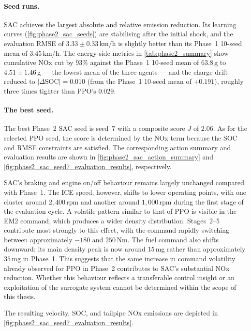 \paragraph{Seed runs.}
SAC achieves the largest absolute and relative emission reduction. Its learning curves (\autoref{fig:phase2_sac_seeds}) are stabilising after the initial shock, and the evaluation \ac{RMSE} of $3.33 \pm 0.33$\,km/h is slightly better than its Phase~1 10-seed mean of $3.45$\,km/h. The energy-side metrics in \autoref{tab:phase2_summary} show cumulative \ac{NOx} cut by $93\%$ against the Phase~1 10-seed mean of $63.8$\,g to $4.51 \pm 1.46$\,g --- the lowest mean of the three agents --- and the charge drift reduced to $|\Delta\text{SOC}| = 0.010$ (from the Phase~1 10-seed mean of $+0.191$), roughly three times tighter than PPO's $0.029$.

\paragraph{The best seed.}
The best Phase~2 SAC seed is seed~7 with a composite score $J$ of 2.06. As for the selected PPO seed, the score is determined by the \ac{NOx} term because the \ac{SOC} and \ac{RMSE} constraints are satisfied. The corresponding action summary and evaluation results are shown in \autoref{fig:phase2_sac_action_summary} and \autoref{fig:phase2_sac_seed7_evaluation_results}, respectively.

SAC's braking and engine on/off behaviour remains largely unchanged compared with Phase~1. The \ac{ICE} speed, however, shifts to lower operating points, with one cluster around $2{,}400$\,rpm and another around $1{,}000$\,rpm during the first stage of the evaluation cycle. A volatile pattern similar to that of PPO is visible in the \ac{EM2} command, which produces a wider density distribution. Stages~2--5 contribute most strongly to this effect, with the command rapidly switching between approximately $-180$ and $250$\,Nm. The fuel command also shifts downward: its main density peak is now around $15$\,mg rather than approximately $35$\,mg in Phase~1. This suggests that the same increase in command volatility already observed for PPO in Phase~2 contributes to SAC's substantial \ac{NOx} reduction. Whether this behaviour reflects a transferable control insight or an exploitation of the surrogate system cannot be determined within the scope of this thesis.

The resulting velocity, \ac{SOC}, and tailpipe \ac{NOx} emissions are depicted in \autoref{fig:phase2_sac_seed7_evaluation_results}.

